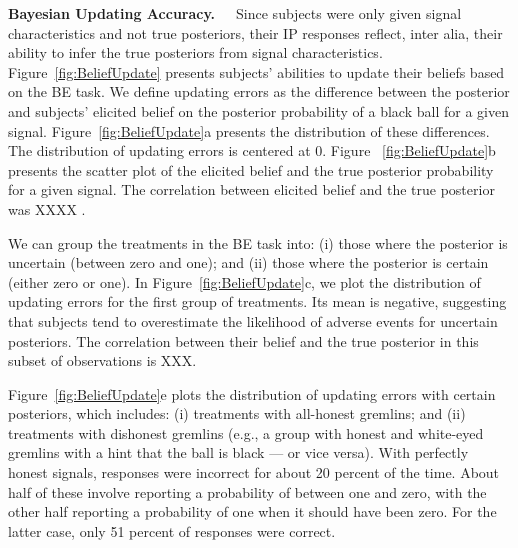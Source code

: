 \documentclass[12pt,a4paper]{article}
\begin{document}

\bigskip\noindent\textbf{Bayesian Updating Accuracy.}\ \ \ Since subjects were only given signal characteristics and not true posteriors, their IP responses reflect, inter alia, their ability to infer the true posteriors from signal characteristics. 
Figure~\ref{fig:BeliefUpdate} presents subjects' abilities to update their beliefs based on the BE task. We define updating errors as the difference between the posterior and subjects’ elicited belief on the posterior probability of a black ball for a given signal. Figure~\ref{fig:BeliefUpdate}a presents the distribution of these differences. The distribution of updating errors is centered at 0. Figure ~\ref{fig:BeliefUpdate}b presents the scatter plot of the elicited belief and the true posterior probability for a given signal. The correlation between elicited belief and the true posterior was XXXX . 

We can group the treatments in the BE task into: (i) those where the posterior is uncertain (between zero and one); and (ii) those where the posterior is certain (either zero or one). In Figure~\ref{fig:BeliefUpdate}c, we plot the distribution of updating errors for the first group of treatments. Its mean is negative, suggesting that subjects tend to overestimate the likelihood of adverse events for uncertain posteriors. The correlation between their belief and the true posterior in this subset of observations is XXX.
 
Figure~\ref{fig:BeliefUpdate}e plots the distribution of updating errors with certain posteriors, which includes: (i) treatments with all-honest gremlins; and (ii) treatments with dishonest gremlins (e.g., a group with honest and white-eyed gremlins with a hint that the ball is black — or vice versa). With perfectly honest signals, responses were incorrect for about 20 percent of the time. About half of these involve reporting a probability of between one and zero, with the other half reporting a probability of one when it should have been zero. For the latter case, only 51 percent of responses were correct. 

\end{document}
